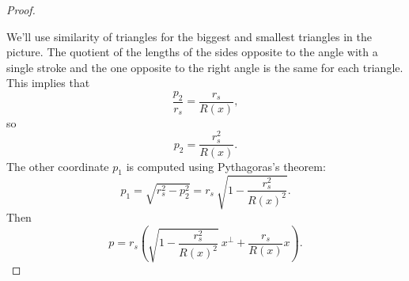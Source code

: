 \documentclass[10pt,a4paper]{amsart}
\begin{document}
\begin{proof}
\begin{center}
	\end{center}
	We'll use similarity of triangles for the biggest and smallest triangles in the picture. The quotient of the lengths of the sides opposite to the angle with a single stroke and the one opposite to the right angle is the same for each triangle. This implies that
	\begin{equation}
		\frac{p_2}{r_s} = \frac{r_s}{R(x)},
	\end{equation}
	so
	\begin{equation}
		p_2 = \frac{r_s^2}{R(x)}.
	\end{equation}
	The other coordinate $p_1$ is computed using Pythagoras's theorem:
	\begin{equation}
		p_1 = \sqrt{r_s^2-p_2^2} = r_s \ \sqrt{1 - \frac{r_s^2}{R(x)^2}}.
	\end{equation}
	Then
	\begin{equation}
		\label{equation: p}
		p = r_s \left( \sqrt{1 - \frac{r_s^2}{R(x)^2}} \ x^\perp +  \frac{r_s}{R(x)} x \right).
	\end{equation}
	

\end{proof}
\end{document}
